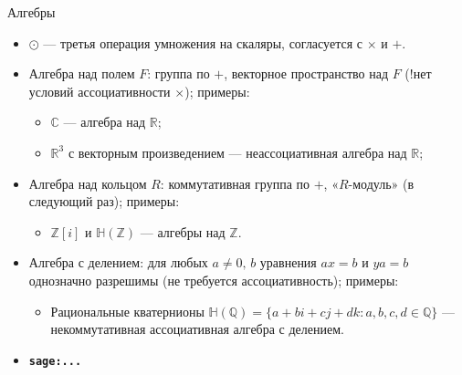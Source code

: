 \documentclass[serif, aspectratio=169]{beamer}
\newcommand{\sagemark}{%
  \textcolor{green!40!black}{\textbf{\texttt{sage:...}}}%
}
\begin{document}
\begin{frame}{Алгебры}
    \begin{itemize}
        \item $\odot$ --- третья операция умножения на скаляры, согласуется с $\times$ и $+$.
        \item Алгебра над полем $F$: группа по $+$, векторное пространство над $F$ (!нет условий ассоциативности $\times$); примеры:
        \begin{itemize}
            \item $\mathbb{C}$ --- алгебра над $\mathbb{R}$;
            \item $\mathbb{R}^3$ с векторным произведением --- неассоциативная алгебра над $\mathbb{R}$;
        \end{itemize}
        \item Алгебра над кольцом $R$: коммутативная группа по $+$, «$R$-модуль» (в следующий раз); примеры:
        \begin{itemize}
            \item $\mathbb{Z}[i]$ и $\mathbb{H}(\mathbb{Z})$ --- алгебры над $\mathbb{Z}$.
        \end{itemize}
        \item Алгебра с делением: для любых $a\ne0,\,b$ уравнения $ax=b$ и $ya=b$ однозначно разрешимы (не требуется ассоциативность); примеры:
        \begin{itemize}
            \item Рациональные кватернионы $\mathbb{H}(\mathbb{Q})=\{a+bi+cj+dk : a,b,c,d\in\mathbb{Q}\}$ --- некоммутативная ассоциативная алгебра с делением.
        \end{itemize}
        \item \sagemark
    \end{itemize}
\end{frame}
\end{document}
